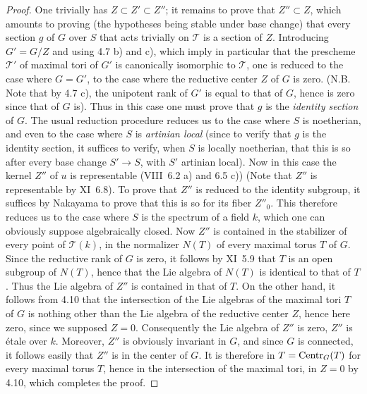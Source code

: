\begin{proof}
One trivially has $Z\subset Z'\subset Z''$; it remains to prove that $Z''\subset Z$, which amounts to proving (the hypotheses being stable under base change) that every section $g$ of $G$ over $S$ that acts trivially on $\mathscr T$ is a section of $Z$. Introducing $G'=G/Z$ and using 4.7 b) and c), which imply in particular that the prescheme $\mathscr T'$ of maximal tori of $G'$ is canonically isomorphic to $\mathscr T$, one is reduced to the case where $G=G'$, \ie to the case where the reductive center $Z$ of $G$ is zero. (N.B. Note that by 4.7 c), the unipotent rank of $G'$ is equal to that of $G$, hence is zero since that of $G$ is). Thus in this case one must prove that $g$ is the \emph{identity section} of $G$. The usual reduction procedure reduces us to the case where $S$ is noetherian, and even to the case where $S$ is \emph{artinian local} (since to verify that $g$ is the identity section, it suffices to verify, when $S$ is locally noetherian, that this is so after every base change $S'\to S$, with $S'$ artinian local). Now in this case the kernel $Z''$ of $u$ is representable (VIII~6.2 a) and 6.5 c)) (Note that $Z''$ is representable by XI~6.8). To prove that $Z''$ is reduced to the identity subgroup, it suffices by Nakayama to prove that this is so for its fiber $Z''_0$. This therefore reduces us to the case where $S$ is the spectrum of a field $k$, which one can obviously suppose algebraically closed. Now $Z''$ is contained in the stabilizer of every point of $\mathscr T(k)$, \ie in the normalizer $N(T)$ of every maximal torus $T$ of $G$. Since the reductive rank of $G$ is zero, it follows by XI~5.9 that $T$ is an open subgroup of $N(T)$, hence that the Lie algebra of $N(T)$ is identical to that of $T$. Thus the Lie algebra of $Z''$ is contained in that of $T$. On the other hand, it follows from 4.10 that the intersection of the Lie algebras of the maximal tori $T$ of $G$ is nothing other than the Lie algebra of the reductive center $Z$, hence here zero, since we supposed $Z=0$. Consequently the Lie algebra of $Z''$ is zero, \ie $Z''$ is étale over $k$. Moreover, $Z''$ is obviously invariant in $G$, and since $G$ is connected, it follows easily that $Z''$ is in the center of $G$. It is therefore in $T=\operatorname{Centr}_G(T)$ for every maximal torus $T$, hence in the intersection of the maximal tori, \ie in $Z=0$ by 4.10, which completes the proof.
\end{proof}

